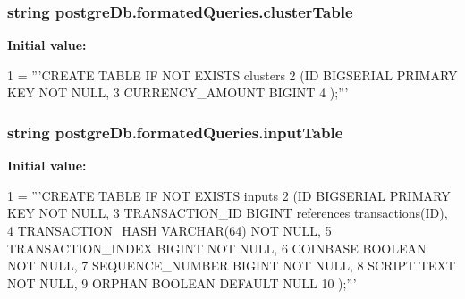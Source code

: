 \subsubsection[{cluster\+Table}]{\setlength{\rightskip}{0pt plus 5cm}string postgre\+Db.\+formated\+Queries.\+cluster\+Table}\label{namespacepostgreDb_1_1formatedQueries_a0742871fe89794f66dea1edd1252acd6}
{\bfseries Initial value\+:}
\begin{DoxyCode}
1 = \textcolor{stringliteral}{'''CREATE TABLE IF NOT EXISTS clusters}
2 \textcolor{stringliteral}{                (ID                 BIGSERIAL PRIMARY KEY   NOT NULL,}
3 \textcolor{stringliteral}{                CURRENCY\_AMOUNT     BIGINT}
4 \textcolor{stringliteral}{                );'''}
\end{DoxyCode}
\hypertarget{namespacepostgreDb_1_1formatedQueries_a2b43fd522f2cdccef97fbcaa3741a732}{}
\subsubsection[{input\+Table}]{\setlength{\rightskip}{0pt plus 5cm}string postgre\+Db.\+formated\+Queries.\+input\+Table}\label{namespacepostgreDb_1_1formatedQueries_a2b43fd522f2cdccef97fbcaa3741a732}
{\bfseries Initial value\+:}
\begin{DoxyCode}
1 = \textcolor{stringliteral}{'''CREATE TABLE IF NOT EXISTS inputs}
2 \textcolor{stringliteral}{                (ID                 BIGSERIAL PRIMARY KEY   NOT NULL,}
3 \textcolor{stringliteral}{                TRANSACTION\_ID      BIGINT              references transactions(ID),}
4 \textcolor{stringliteral}{                TRANSACTION\_HASH    VARCHAR(64)         NOT NULL,}
5 \textcolor{stringliteral}{                TRANSACTION\_INDEX   BIGINT              NOT NULL,}
6 \textcolor{stringliteral}{                COINBASE            BOOLEAN             NOT NULL,}
7 \textcolor{stringliteral}{                SEQUENCE\_NUMBER     BIGINT              NOT NULL,}
8 \textcolor{stringliteral}{                SCRIPT              TEXT                NOT NULL,}
9 \textcolor{stringliteral}{                ORPHAN              BOOLEAN             DEFAULT NULL}
10 \textcolor{stringliteral}{                );'''}
\end{DoxyCode}
\hypertarget{namespacepostgreDb_1_1formatedQueries_a09445394a01258a235aa4db0ea66ea58}{}
